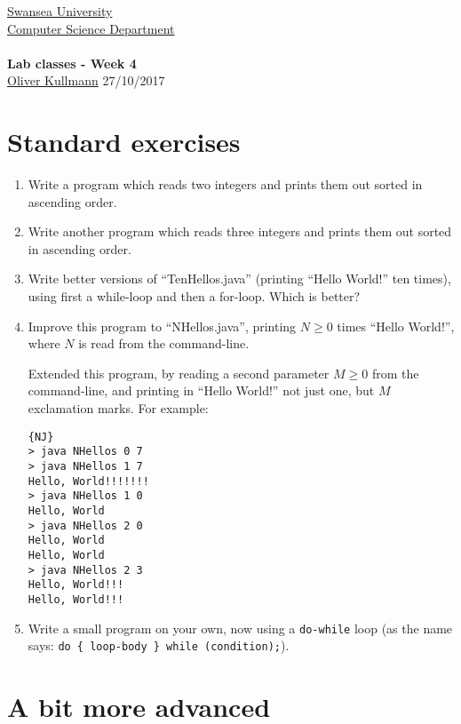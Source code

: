 \documentclass[11pt]{article}
\newcommand{\Java}{\lstset{language=Java,keywordstyle=\bfseries,breaklines,breakindent=30pt}}
\begin{document}
\begin{center}
  \href{http://www.swan.ac.uk/}{Swansea University}\\
  \href{http://www.swan.ac.uk/compsci/}{Computer Science Department}\\[1ex]
  \href{\chp}{\module}\\[1ex]
  \textbf{Lab classes - Week 4}\\
  \href{http://cs.swan.ac.uk/~csoliver}{Oliver Kullmann} 27/10/2017
\end{center}


\section{Standard exercises}
\label{sec:stdex}

\Java

\begin{enumerate}
\item Write a program which reads two integers and prints them out sorted in ascending order.
\item Write another program which reads three integers and prints them out sorted in ascending order.
\item Write better versions of ``TenHellos.java'' (printing ``Hello World!'' ten times), using first a while-loop and then a for-loop. Which is better?
\item Improve this program to ``NHellos.java'', printing $N \ge 0$ times ``Hello World!'', where $N$ is read from the command-line.

  Extended this program, by reading a second parameter $M \ge 0$ from the command-line, and printing in ``Hello World!'' not just one, but $M$ exclamation marks. For example:
  \begin{lstlisting}{NJ}
> java NHellos 0 7
> java NHellos 1 7
Hello, World!!!!!!!
> java NHellos 1 0
Hello, World
> java NHellos 2 0
Hello, World
Hello, World
> java NHellos 2 3
Hello, World!!!
Hello, World!!!
  \end{lstlisting}
\item Write a small program on your own, now using a \texttt{do-while} loop (as the name says: \texttt{do \{ loop-body \} while (condition);}).
\end{enumerate}


\section{A bit more advanced}
\label{sec:advanced}
\end{document}
